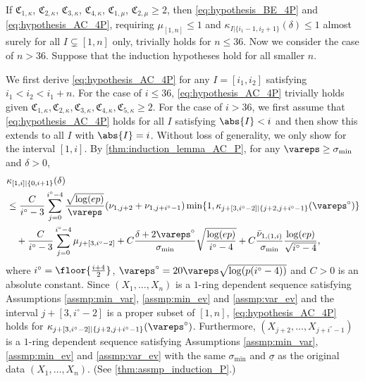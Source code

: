 \documentclass[aos]{imsart}
\begin{document}
\begin{appendix}
If $\mathfrak{C}_{1,\kappa}$, $\mathfrak{C}_{2,\kappa}$, $\mathfrak{C}_{3,\kappa}$, $\mathfrak{C}_{4,\kappa}$, $\mathfrak{C}_{1,\mu}$, $\mathfrak{C}_{2,\mu} \geq 2$, then \eqref{eq:hypothesis_BE_4P} and \eqref{eq:hypothesis_AC_4P}, requiring $\mu_{[1,n]} \leq 1$ and $\kappa_{I|\{i_1-1,i_2+1\}}(\delta) \leq 1$ almost surely for all $I \subsetneq [1,n]$ only, trivially holds for $n \leq 36$. Now we consider the case of $n > 36$. Suppose that the induction hypotheses hold for all smaller $n$. 

\medskip
We first derive \eqref{eq:hypothesis_AC_4P} for any $I = [i_1, i_2]$ satisfying $i_1 < i_2 < i_1+n$. For the case of $i \leq 36$, \eqref{eq:hypothesis_AC_4P} trivially holds given $\mathfrak{C}_{1,\kappa}, \mathfrak{C}_{2,\kappa}, \mathfrak{C}_{3,\kappa}, \mathfrak{C}_{4,\kappa}, \mathfrak{C}_{5,\kappa} \geq 2$. For the case of $i > 36$, we first assume that \eqref{eq:hypothesis_AC_4P} holds for all $I$ satisfying $\abs{I} < i$ and then show this extends to all $I$ with $\abs{I} = i$. Without loss of generality, we only show for the interval $[1,i]$.
By \cref{thm:induction_lemma_AC_P}, 
for any $\vareps \geq \sigma_{\min}$ and $\delta > 0$,
\begin{equation*} %
\begin{aligned}
    & \kappa_{[1,i]|\{0, i+1\}}(\delta) \\
    & \leq \frac{C}{i^\circ-3} \sum_{j=0}^{i^\circ-4}  
    \frac{\sqrt{\log(ep)}}{\vareps} (\nu_{1,j+2} + \nu_{1,j+i^\circ-1}) 
    \min\{1, \kappa_{j+[3,i^\circ-2]|\{j+2, j+i^\circ-1\}}(\vareps^\circ)\} \\
    & \quad + \frac{C}{i^\circ-3} \sum_{j=0}^{i^\circ-4} \mu_{j+[3,i^\circ-2]}
    + C\frac{\delta + 2\vareps^\circ}{\sigma_{\min}} \sqrt{\frac{\log(ep)}{i^\circ-4}}
    + C\frac{\bar\nu_{1,(1,i)}}{\sigma_{\min}} \frac{\log(ep)}{\sqrt{i^\circ-4}},
\end{aligned}
\end{equation*}
where $i^\circ = \floor{\frac{i+4}{2}}$, $\vareps^\circ = 20\vareps \sqrt{\log(p(i^\circ-4))}$ and $C > 0$ is an absolute constant. 
Since $(X_1, \dots, X_n)$ is a $1$-ring dependent sequence satisfying Assumptions \eqref{assmp:min_var}, \eqref{assmp:min_ev} and \eqref{assmp:var_ev} and the interval $j+[3,i^\circ-2]$ is a proper subset of $[1,n]$, \eqref{eq:hypothesis_AC_4P} holds for $\kappa_{j+[3,i^\circ-2]|\{j+2, j+i^\circ-1\}}(\vareps^\circ)$. Furthermore, $(X_{j+2}, \dots, X_{j+i^\circ-1})$ is a $1$-ring dependent sequence satisfying Assumptions \eqref{assmp:min_var}, \eqref{assmp:min_ev} and \eqref{assmp:var_ev} with the same $\sigma_{\min}$ and $\underline{\sigma}$ as the original data $(X_1, \dots, X_n)$. (See \cref{thm:assmp_induction_P}.) 

\end{appendix}
\end{document}
